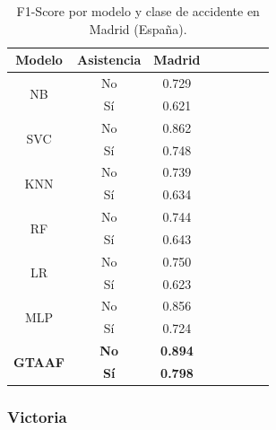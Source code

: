 \documentclass{uathesis-es}
\begin{document}
{\begin{table}[H]
\begin{center}
\begin{tabular}{|c|c||c|c|c|c|c|c|}
        \textbf{Modelo} & \textbf{Asistencia} & Madrid
        \\ \hline \hline

        \multirow{2}{*}{NB} &
            No &  0.729 \\ &
            Sí & 0.621 \\ \hline \hline
        \multirow{2}{*}{SVC} &
            No & 0.862 \\ &
            Sí &  0.748 \\ \hline \hline
        \multirow{2}{*}{KNN} &
            No  & 0.739 \\ &
            Sí & 0.634 \\ \hline \hline
        \multirow{2}{*}{RF} &
            No & 0.744 \\ &
            Sí & 0.643  \\ \hline \hline
        \multirow{2}{*}{LR} &
            No &  0.750 \\ &
            Sí & 0.623 \\ \hline \hline
        \multirow{2}{*}{MLP} &
            No & 0.856 \\ &
            Sí & 0.724  \\ \hline \hline
        \multirow{2}{*}{\textbf{GTAAF}} &
            \textbf{No} & \textbf{0.894} \\ &
            \textbf{Sí} & \textbf{0.798} \\ \hline \hline
        \end{tabular}
    \end{center}
    \caption{F1-Score por modelo y clase de accidente en Madrid (España).}
    \label{SpainMetrics}
\end{table}

\subsubsection*{Victoria}

}
\end{document}
